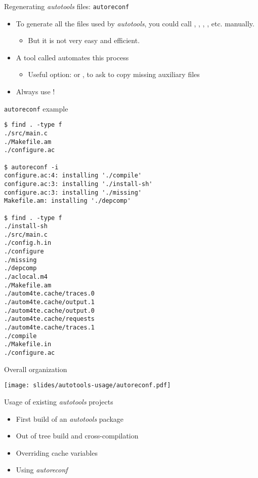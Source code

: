 \begin{frame}{Regenerating {\em autotools} files: {\tt autoreconf}}
  \begin{itemize}
  \item To generate all the files used by {\em autotools}, you could
    call , , ,
    , etc. manually.
    \begin{itemize}
    \item But it is not very easy and efficient.
    \end{itemize}
  \item A tool called  automates this process
    \begin{itemize}
    \item Useful option:  or , to ask
       to copy missing auxiliary files
    \end{itemize}
  \item Always use !
  \end{itemize}
\end{frame}

\begin{frame}[fragile]{{\tt autoreconf} example}

\begin{block}{}
{\tiny
\begin{verbatim}
$ find . -type f
./src/main.c
./Makefile.am
./configure.ac

$ autoreconf -i
configure.ac:4: installing './compile'
configure.ac:3: installing './install-sh'
configure.ac:3: installing './missing'
Makefile.am: installing './depcomp'

$ find . -type f
./install-sh
./src/main.c
./config.h.in
./configure
./missing
./depcomp
./aclocal.m4
./Makefile.am
./autom4te.cache/traces.0
./autom4te.cache/output.1
./autom4te.cache/output.0
./autom4te.cache/requests
./autom4te.cache/traces.1
./compile
./Makefile.in
./configure.ac
\end{verbatim}}
\end{block}

\end{frame}

\begin{frame}{Overall organization}

  \begin{center}
    \texttt{[image: slides/autotools-usage/autoreconf.pdf]}
  \end{center}

\end{frame}

\setuplabframe
{Usage of existing {\em autotools} projects}
{
  \begin{itemize}
  \item First build of an {\em autotools} package
  \item Out of tree build and cross-compilation
  \item Overriding cache variables
  \item Using {\em autoreconf}
  \end{itemize}
}

